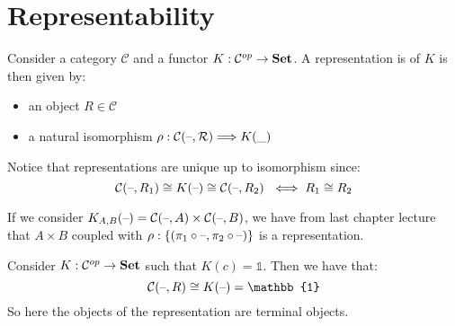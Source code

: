 \chapter{Representability}

\begin{definition}[Representation]
Consider a category $\mathcal{C}$ and a functor 
$K: \mathcal{C}^{op} \rightarrow \mathbf {Set} $.
A representation is of $K$ is then given by:
\begin{itemize}
  \item an object $R \in \mathcal{C}$
  \item a natural isomorphism $\rho: \mathcal{C(\text{--}, R)} \Longrightarrow K(\_) $
  \end{itemize}
\end{definition}
Notice that representations are unique up to isomorphism since:
\[\mathcal{C}(\text{--}, R_1) \cong K(\text{--}) \cong 
\mathcal{C}(\text{--}, R_2)\ \iff R_1 \cong R_2\]

\begin{example}
If we consider $K_{A,B}(\text{--}) = \mathcal{C}(\text{--}, A) \times \mathcal{C}
(\text{--}, B)$, we have from last chapter lecture that $A \times B$ coupled with 
$\rho : \{ (\pi_1 \circ \text{--}, \pi_2 \circ \text{--}) \}$ is a representation.
\end{example}

\begin{example}
Consider  $K: \mathcal{C}^{op} \rightarrow \mathbf {Set} $ such that 
$K(c) = \mathbb{1}$. Then we have that:
\[\mathcal{C}(\phold, R) \cong K(\phold) = \mathbb{1}\]
So here the objects of the representation are terminal objects.

\end{example}

